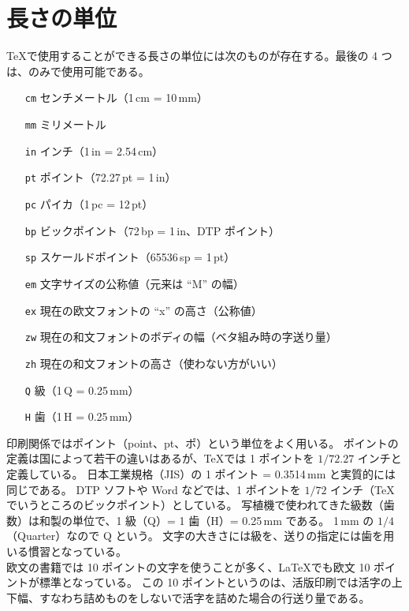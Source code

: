 \section{長さの単位}
\TeX{}で使用することができる長さの単位には次のものが存在する。最後の 4 つは\pTeX、\upTeX{}のみで使用可能である。
\begin{itemize}\setlength{\leftskip}{+1.00zw}\setlength{\labelsep}{+1.00zw}
  \item[\texttt{cm}] センチメートル（1\,cm = 10\,mm）
  \item[\texttt{mm}] ミリメートル
  \item[\texttt{in}] インチ（1\,in = 2.54\,cm）
  \item[\texttt{pt}] ポイント（72.27\,pt = 1\,in）
  \item[\texttt{pc}] パイカ（1\,pc = 12\,pt）
  \item[\texttt{bp}] ビックポイント（72\,bp = 1\,in、DTP ポイント）
  \item[\texttt{sp}] スケールドポイント（65536\,sp = 1\,pt）
  \item[\texttt{em}] 文字サイズの公称値（元来は ``M'' の幅）
  \item[\texttt{ex}] 現在の欧文フォントの ``x'' の高さ（公称値）
  \item[\texttt{zw}] 現在の和文フォントのボディの幅（ベタ組み時の字送り量）
  \item[\texttt{zh}] 現在の和文フォントの高さ（使わない方がいい）
  \item[\texttt{Q}]  級（1\,Q = 0.25\,mm）
  \item[\texttt{H}]  歯（1\,H = 0.25\,mm）
\end{itemize}
印刷関係ではポイント（point、pt、ポ）という単位をよく用いる。
ポイントの定義は国によって若干の違いはあるが、\TeX{}では 1 ポイントを $1/72.27$ インチと定義している。
日本工業規格（JIS）の 1 ポイント = 0.3514\,mm と実質的には同じである。
DTP ソフトや Word などでは、1 ポイントを $1/72$ インチ（\TeX{}でいうところのビックポイント）としている。
写植機で使われてきた級数（歯数）は和製の単位で、1 級（Q）= 1 歯（H）= 0.25\,mm である。
1\,mm の $1/4$（Quarter）なので Q という。
文字の大きさには級を、送りの指定には歯を用いる慣習となっている。\\

欧文の書籍では 10 ポイントの文字を使うことが多く、\LaTeX{}でも欧文 10 ポイントが標準となっている。
この 10 ポイントというのは、活版印刷では活字の上下幅、すなわち詰めものをしないで活字を詰めた場合の行送り量である。\\

